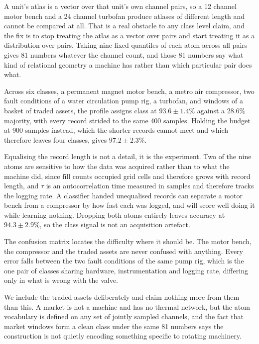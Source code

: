 \documentclass[11pt]{article}
\begin{document}
A unit's atlas is a vector over that unit's own channel pairs, so a 12 channel
motor bench and a 24 channel turbofan produce atlases of different length and
cannot be compared at all. That is a real obstacle to any class level claim,
and the fix is to stop treating the atlas as a vector over pairs and start
treating it as a distribution over pairs. Taking nine fixed quantiles of each
atom across all pairs gives 81 numbers whatever the channel count, and those 81
numbers say what kind of relational geometry a machine has rather than which
particular pair does what.

Across six classes, a permanent magnet motor bench, a metro air compressor, two
fault conditions of a water circulation pump rig, a turbofan, and windows of a
basket of traded assets, the profile assigns class at $93.6\pm1.4\%$ against a
$28.6\%$ majority, with every record strided to the same 400 samples. Holding
the budget at 900 samples instead, which the shorter records cannot meet and
which therefore leaves four classes, gives $97.2\pm2.3\%$.

Equalising the record length is not a detail, it is the experiment. Two of the
nine atoms are sensitive to how the data was acquired rather than to what the
machine did, since $\mathrm{fill}$ counts occupied grid cells and therefore
grows with record length, and $\tau$ is an autocorrelation time measured in
samples and therefore tracks the logging rate. A classifier handed unequalised
records can separate a motor bench from a compressor by how fast each was
logged, and will score well doing it while learning nothing. Dropping both
atoms entirely leaves accuracy at $94.3\pm2.9\%$, so the class signal is not an
acquisition artefact.

The confusion matrix locates the difficulty where it should be. The motor
bench, the compressor and the traded assets are never confused with anything.
Every error falls between the two fault conditions of the same pump rig, which
is the one pair of classes sharing hardware, instrumentation and logging rate,
differing only in what is wrong with the valve.

We include the traded assets deliberately and claim nothing more from them than
this. A market is not a machine and has no thermal network, but the atom
vocabulary is defined on any set of jointly sampled channels, and the fact that
market windows form a clean class under the same 81 numbers says the
construction is not quietly encoding something specific to rotating machinery.
\end{document}
